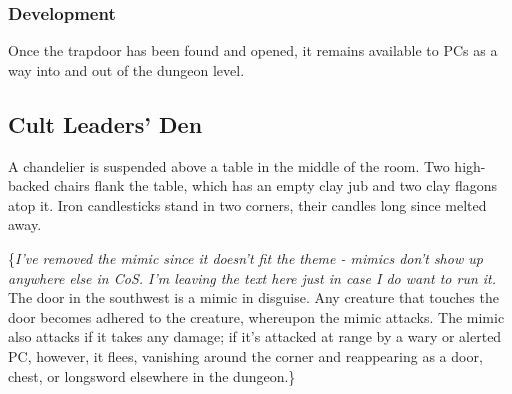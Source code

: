 \subsubsection*{Development}
Once the trapdoor has been found and opened, it remains available to PCs as a way into and out of the
dungeon level.

\begin{arealinks}
\end{arealinks}


\pagebreak
\subsection{Cult Leaders' Den}
\label{sec:CultLeadersDen}
\begin{readout}
  A chandelier is suspended above a table in the middle of the room. Two high-backed chairs flank the table,
  which has an empty clay jub and two clay flagons atop it. Iron candlesticks stand in two corners, their
  candles long since melted away.
\end{readout}
\{\textit{I've removed the mimic since it doesn't fit the theme - mimics don't show up anywhere else in CoS. I'm 
leaving the text here just in case I do want to run it.}
The door in the southwest is a mimic in disguise. Any creature that touches the door becomes adhered to the
creature, whereupon the mimic attacks. The mimic also attacks if it takes any damage; if it's attacked at
range by a wary or alerted PC, however, it flees, vanishing around the corner and reappearing as a door,
chest, or longsword elsewhere in the dungeon.\}

\begin{arealinks}
\end{arealinks}


\pagebreak
